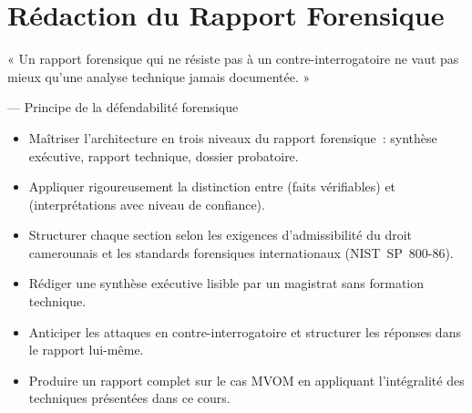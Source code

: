
\chapter{Rédaction du Rapport Forensique}
\label{chap:rapport}

\epigraph{%
    « Un rapport forensique qui ne résiste pas à un contre-interrogatoire
    ne vaut pas mieux qu'une analyse technique jamais documentée. »%
}{--- Principe de la défendabilité forensique}


\begin{boxobjectifs}
\begin{itemize}
    \item Maîtriser l'architecture en trois niveaux du rapport
          forensique~: synthèse exécutive, rapport technique,
          dossier probatoire.
    \item Appliquer rigoureusement la distinction entre
           (faits vérifiables) et
           (interprétations avec niveau de
          confiance).
    \item Structurer chaque section selon les exigences
          d'admissibilité du droit camerounais et les standards
          forensiques internationaux (NIST~SP~800-86).
    \item Rédiger une synthèse exécutive lisible par un magistrat
          sans formation technique.
    \item Anticiper les attaques en contre-interrogatoire et
          structurer les réponses dans le rapport lui-même.
    \item Produire un rapport complet sur le cas MVOM en appliquant
          l'intégralité des techniques présentées dans ce cours.
\end{itemize}
\end{boxobjectifs}

